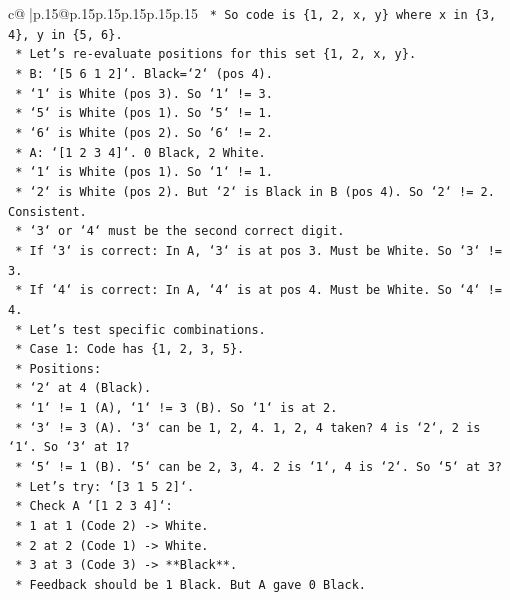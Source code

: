 \documentclass{article}
\begin{document}
{\begin{supertabular}{c@{$\;$}|p{.15\linewidth}@{}p{.15\linewidth}p{.15\linewidth}p{.15\linewidth}p{.15\linewidth}p{.15\linewidth}}
{{{\texttt{    *   So code is \{1, 2, x, y\} where x in \{3, 4\}, y in \{5, 6\}.} \\
\texttt{    *   Let's re{-}evaluate positions for this set \{1, 2, x, y\}.} \\
\texttt{    *   B: `{[}5 6 1 2{]}`. Black=`2` (pos 4).} \\
\texttt{        *   `1` is White (pos 3). So `1` != 3.} \\
\texttt{        *   `5` is White (pos 1). So `5` != 1.} \\
\texttt{        *   `6` is White (pos 2). So `6` != 2.} \\
\texttt{    *   A: `{[}1 2 3 4{]}`. 0 Black, 2 White.} \\
\texttt{        *   `1` is White (pos 1). So `1` != 1.} \\
\texttt{        *   `2` is White (pos 2). But `2` is Black in B (pos 4). So `2` != 2. Consistent.} \\
\texttt{        *   `3` or `4` must be the second correct digit.} \\
\texttt{        *   If `3` is correct: In A, `3` is at pos 3. Must be White. So `3` != 3.} \\
\texttt{        *   If `4` is correct: In A, `4` is at pos 4. Must be White. So `4` != 4.} \\
\texttt{    *   Let's test specific combinations.} \\
\texttt{    *   Case 1: Code has \{1, 2, 3, 5\}.} \\
\texttt{        *   Positions:} \\
\texttt{            *   `2` at 4 (Black).} \\
\texttt{            *   `1` != 1 (A), `1` != 3 (B). So `1` is at 2.} \\
\texttt{            *   `3` != 3 (A). `3` can be 1, 2, 4. 1, 2, 4 taken? 4 is `2`, 2 is `1`. So `3` at 1?} \\
\texttt{            *   `5` != 1 (B). `5` can be 2, 3, 4. 2 is `1`, 4 is `2`. So `5` at 3?} \\
\texttt{            *   Let's try: `{[}3 1 5 2{]}`.} \\
\texttt{            *   Check A `{[}1 2 3 4{]}`:} \\
\texttt{                *   1 at 1 (Code 2) {-}> White.} \\
\texttt{                *   2 at 2 (Code 1) {-}> White.} \\
\texttt{                *   3 at 3 (Code 3) {-}> **Black**.} \\
\texttt{                *   Feedback should be 1 Black. But A gave 0 Black.} \\
}}}
\end{supertabular}}
\end{document}
